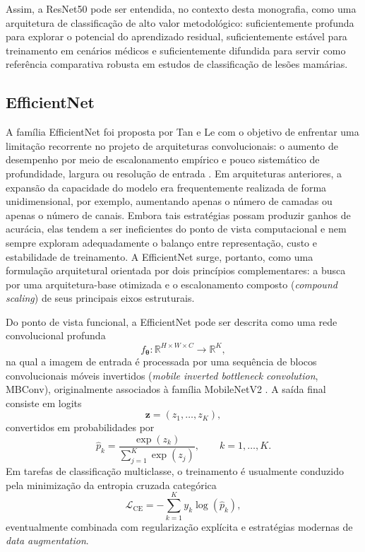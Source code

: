 \documentclass[tcc,capa]{texufpel}
\begin{document}
Assim, a ResNet50 pode ser entendida, no contexto desta monografia, como uma arquitetura de classificação de alto valor metodológico: suficientemente profunda para explorar o potencial do aprendizado residual, suficientemente estável para treinamento em cenários médicos e suficientemente difundida para servir como referência comparativa robusta em estudos de classificação de lesões mamárias.

\subsection{EfficientNet}

A família EfficientNet foi proposta por Tan e Le com o objetivo de enfrentar uma limitação recorrente no projeto de arquiteturas convolucionais: o aumento de desempenho por meio de escalonamento empírico e pouco sistemático de profundidade, largura ou resolução de entrada \cite{Tan2019EfficientNet}. Em arquiteturas anteriores, a expansão da capacidade do modelo era frequentemente realizada de forma unidimensional, por exemplo, aumentando apenas o número de camadas ou apenas o número de canais. Embora tais estratégias possam produzir ganhos de acurácia, elas tendem a ser ineficientes do ponto de vista computacional e nem sempre exploram adequadamente o balanço entre representação, custo e estabilidade de treinamento. A EfficientNet surge, portanto, como uma formulação arquitetural orientada por dois princípios complementares: a busca por uma arquitetura-base otimizada e o escalonamento composto (\textit{compound scaling}) de seus principais eixos estruturais.

Do ponto de vista funcional, a EfficientNet pode ser descrita como uma rede convolucional profunda
\begin{equation}
	f_{\boldsymbol{\theta}} : \mathbb{R}^{H \times W \times C} \rightarrow \mathbb{R}^{K},
\end{equation}
na qual a imagem de entrada é processada por uma sequência de blocos convolucionais móveis invertidos (\textit{mobile inverted bottleneck convolution}, MBConv), originalmente associados à família MobileNetV2 \cite{Sandler2018}. A saída final consiste em logits
\begin{equation}
	\mathbf{z} = (z_1,\dots,z_K),
\end{equation}
convertidos em probabilidades por
\begin{equation}
	\hat{p}_k = \frac{\exp(z_k)}{\sum_{j=1}^{K}\exp(z_j)},
	\qquad k=1,\dots,K.
\end{equation}
Em tarefas de classificação multiclasse, o treinamento é usualmente conduzido pela minimização da entropia cruzada categórica
\begin{equation}
	\mathcal{L}_{\text{CE}}
	=
	-\sum_{k=1}^{K} y_k \log(\hat{p}_k),
\end{equation}
eventualmente combinada com regularização explícita e estratégias modernas de \textit{data augmentation}.
\end{document}
